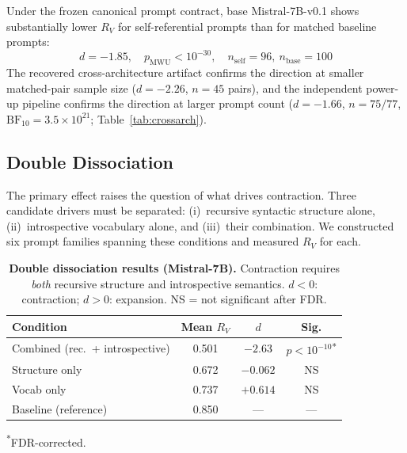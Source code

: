 \documentclass{article}
\newcommand{\RV}{R_V}
\newcommand{\dcohen}{d}
\begin{document}
Under the frozen canonical prompt contract, base Mistral-7B-v0.1 shows substantially lower $\RV$
for self-referential prompts than for matched baseline prompts:
\begin{equation}
\dcohen = -1.85, \quad p_{\mathrm{MWU}} < 10^{-30}, \quad n_\mathrm{self}=96,\ n_\mathrm{base}=100
\label{eq:primary}
\end{equation}
The recovered cross-architecture artifact confirms the direction at smaller matched-pair sample size
($\dcohen = -2.26$, $n = 45$ pairs), and the independent power-up pipeline confirms the direction
at larger prompt count
($\dcohen = -1.66$, $n = 75/77$, $\mathrm{BF}_{10} = 3.5 \times 10^{21}$;
Table~\ref{tab:crossarch}).

\subsection{Double Dissociation}
\label{sec:dissociation}


The primary effect raises the question of what drives contraction.
Three candidate drivers must be separated: (i)~recursive syntactic structure alone,
(ii)~introspective vocabulary alone, and (iii)~their combination.
We constructed six prompt families spanning these conditions and measured $\RV$ for each.

\begin{table}[h]
\centering
\caption{\textbf{Double dissociation results (Mistral-7B).}
         Contraction requires \emph{both} recursive structure and introspective semantics.
         $\dcohen < 0$: contraction; $\dcohen > 0$: expansion. NS = not significant after FDR.}
\label{tab:dissociation}
\smallskip
\small
\begin{tabular}{lccc}
\toprule
\textbf{Condition} & \textbf{Mean $\RV$} & \textbf{$\dcohen$} & \textbf{Sig.} \\
\midrule
Combined (rec.\ + introspective) & 0.501 & $-2.63$ & $p < 10^{-10}$\textsuperscript{*} \\
Structure only             & 0.672 & $-0.062$ & NS \\
Vocab only                 & 0.737 & $+0.614$ & NS \\
\midrule
Baseline (reference)       & 0.850 & --- & --- \\
\bottomrule
\end{tabular}

\vspace{1mm}\raggedright\footnotesize\textsuperscript{*}FDR-corrected.
\end{table}
\end{document}
